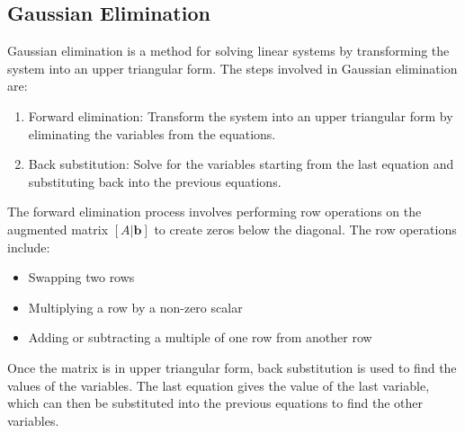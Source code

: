 \subsection{Gaussian Elimination}
Gaussian elimination is a method for solving linear systems by transforming the system into an upper triangular form. The steps involved in Gaussian elimination are:
\begin{enumerate}
	\item Forward elimination: Transform the system into an upper triangular form by eliminating the variables from the equations.
	\item Back substitution: Solve for the variables starting from the last equation and substituting back into the previous equations.
\end{enumerate}
The forward elimination process involves performing row operations on the augmented matrix \([A | \mathbf{b}]\) to create zeros below the diagonal. The row operations include:
\begin{itemize}[label=\(-\)]
	\item Swapping two rows
	\item Multiplying a row by a non-zero scalar
	\item Adding or subtracting a multiple of one row from another row
\end{itemize}
Once the matrix is in upper triangular form, back substitution is used to find the values of the variables. The last equation gives the value of the last variable, which can then be substituted into the previous equations to find the other variables.
